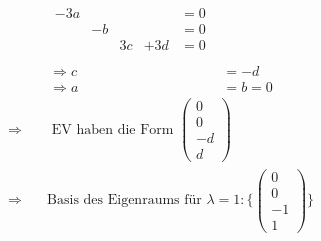 \documentclass{article} %
\begin{document}
\begin{align*}
    \begin{array}{cccccc}
       -3a  &  &  & & = 0  \\
       & -b &   &  & = 0 \\
       &&  3c & +3d & = 0 \\
    \end{array} \\
     \Rightarrow c & = -d \\
     \Rightarrow  a & = b = 0
\end{align*}
\begin{align*}
      \Rightarrow & \quad \text{ EV haben die Form } \begin{pmatrix}
         0 \\ 0 \\ -d \\ d
      \end{pmatrix}  \\
       \Rightarrow & \quad \text{Basis des Eigenraums für } \lambda = 1 : \Biggl\{ \begin{pmatrix}
          0 \\ 0 \\ -1 \\ 1
      \end{pmatrix}   \Biggr\}
\end{align*}
\end{document}
